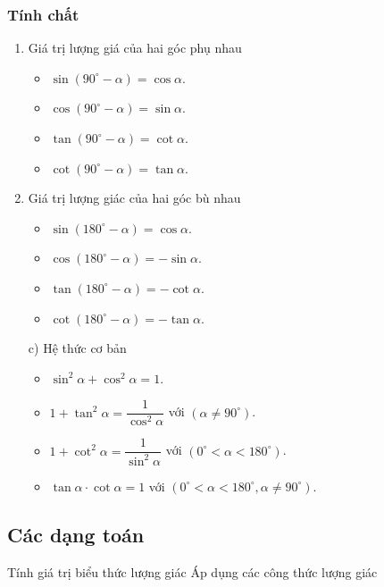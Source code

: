 \subsubsection{Tính chất}
\begin{multicols}{2}
\begin{enumerate}
	\item Giá trị lượng giá của hai góc phụ nhau
	\begin{itemize}
		\item $\sin(90^\circ-\alpha)=\cos\alpha$.
		\item $\cos(90^\circ-\alpha)=\sin\alpha$.
		\item $\tan(90^\circ-\alpha)=\cot\alpha$.
		\item $\cot(90^\circ-\alpha)=\tan\alpha$.
	\end{itemize}
	\item Giá trị lượng giác của hai góc bù nhau
	\begin{itemize}
		\item $\sin(180^\circ-\alpha)=\cos\alpha$.
		\item $\cos(180^\circ-\alpha)=-\sin\alpha$.
		\item $\tan(180^\circ-\alpha)=-\cot\alpha$.
		\item $\cot(180^\circ-\alpha)=-\tan\alpha$.
	\end{itemize}
\end{enumerate}
\end{multicols}
\begin{enumerate}
\item[c)] Hệ thức cơ bản
	\begin{itemize}
		\item $\sin^2\alpha+\cos^2\alpha=1$.
		\item $1+\tan^2\alpha=\dfrac{1}{\cos^2\alpha}$ với $(\alpha\ne 90^\circ)$.
		\item $1+\cot^2\alpha=\dfrac{1}{\sin^2\alpha}$ với $(0^\circ<\alpha< 180^\circ)$.
		\item $\tan\alpha\cdot\cot\alpha=1$ với $(0^\circ<\alpha< 180^\circ, \alpha\ne 90^\circ)$.
	\end{itemize}
\end{enumerate}
\subsection{Các dạng toán}
\begin{dang}{Tính giá trị biểu thức lượng giác}
	Áp dụng các công thức lượng giác
\end{dang}
